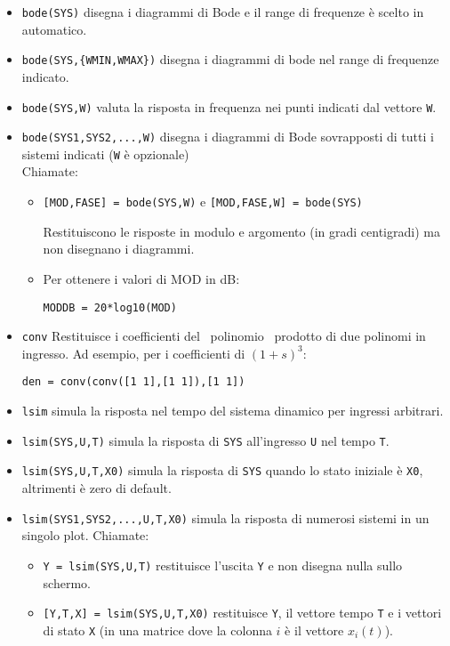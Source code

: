 \begin{itemize}
	\item \texttt{bode(SYS)} disegna i diagrammi di Bode e il range di frequenze è scelto in automatico.
	\item \texttt{bode(SYS,\{WMIN,WMAX\})} disegna i diagrammi di bode nel range di frequenze indicato.
	\item \texttt{bode(SYS,W)} valuta la risposta in frequenza nei punti indicati dal vettore \texttt{W}.
	\item \texttt{bode(SYS1,SYS2,...,W)} disegna i diagrammi di Bode sovrapposti di tutti i sistemi indicati (\texttt{W} è opzionale)\\
	Chiamate:
	      \begin{itemize}
	      	
	      	
	      	\item \texttt{[MOD,FASE] = bode(SYS,W)} e \texttt{[MOD,FASE,W] = bode(SYS)}
	      	      
	      	      Restituiscono le risposte in modulo e argomento (in gradi centigradi) ma non disegnano i diagrammi.
	      	\item Per ottenere i valori di MOD in dB:
	      	      
	      	      \texttt{MODDB = 20*log10(MOD)}
	      \end{itemize}

	\item \texttt{conv} Restituisce i coefficienti del \ polinomio \ prodotto di due polinomi in ingresso. Ad esempio, per i coefficienti di $(1+s)^3$:
	      
	      \texttt{den = conv(conv([1 1],[1 1]),[1 1])}

	\item \texttt{lsim} simula la risposta nel tempo del sistema dinamico per ingressi arbitrari.
	\item \texttt{lsim(SYS,U,T)} simula la risposta di \texttt{SYS} all’ingresso \texttt{U} nel tempo \texttt{T}.
	\item \texttt{lsim(SYS,U,T,X0)} simula la risposta di \texttt{SYS} quando lo stato iniziale è \texttt{X0}, altrimenti è zero di default.
	\item \texttt{lsim(SYS1,SYS2,...,U,T,X0)} simula la risposta di numerosi sistemi in un singolo plot.
	      Chiamate:
	      \begin{itemize}
	      	
	      	
	      	\item \texttt{Y = lsim(SYS,U,T)} restituisce l’uscita \texttt{Y} e non disegna nulla sullo schermo.
	      	\item \texttt{[Y,T,X] = lsim(SYS,U,T,X0)} restituisce \texttt{Y}, il vettore tempo \texttt{T} e i vettori di stato \texttt{X} (in una matrice dove la colonna $i$ è il vettore $x_i(t)$).
	      \end{itemize}


\end{itemize}
